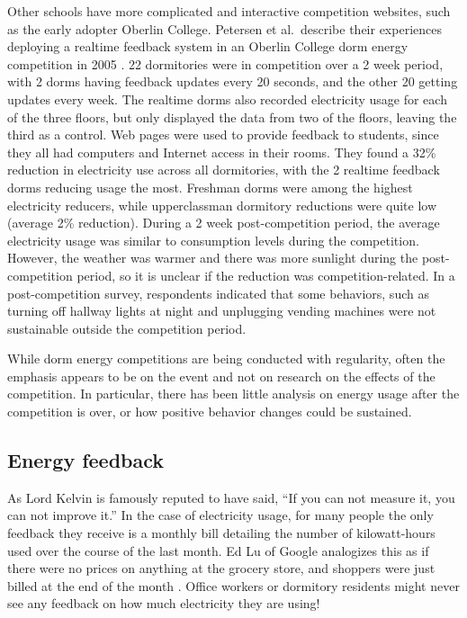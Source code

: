 Other schools have more complicated and interactive competition websites, such as the early adopter Oberlin College. Petersen et al.\ describe their experiences deploying a realtime feedback system in an Oberlin College dorm energy competition in 2005 \cite{petersen-dorm-energy-reduction}. 22 dormitories were in competition over a 2 week period, with 2 dorms having feedback updates every 20 seconds, and the other 20 getting updates every week. The realtime dorms also recorded electricity usage for each of the three floors, but only displayed the data from two of the floors, leaving the third as a control. Web pages were used to provide feedback to students, since they all had computers and Internet access in their rooms. They found a 32\% reduction in electricity use across all dormitories, with the 2 realtime feedback dorms reducing usage the most. Freshman dorms were among the highest electricity reducers, while upperclassman dormitory reductions were quite low (average 2\% reduction). During a 2 week post-competition period, the average electricity usage was similar to consumption levels during the competition. However, the weather was warmer and there was more sunlight during the post-competition period, so it is unclear if the reduction was competition-related. In a post-competition survey, respondents indicated that some behaviors, such as turning off hallway lights at night and unplugging vending machines were not sustainable outside the competition period.

While dorm energy competitions are being conducted with regularity, often the emphasis appears to be on the event and not on research on the effects of the competition. In particular, there has been little analysis on energy usage after the competition is over, or how positive behavior changes could be sustained.

\subsection{Energy feedback}

As Lord Kelvin is famously reputed to have said, ``If you can not measure it, you can not improve it.'' In the case of electricity usage, for many people the only feedback they receive is a monthly bill detailing the number of kilowatt-hours used over the course of the last month. Ed Lu of Google analogizes this as if there were no prices on anything at the grocery store, and shoppers were just billed at the end of the month \cite{Helft2008Googles-Energy}. Office workers or dormitory residents might never see any feedback on how much electricity they are using!

